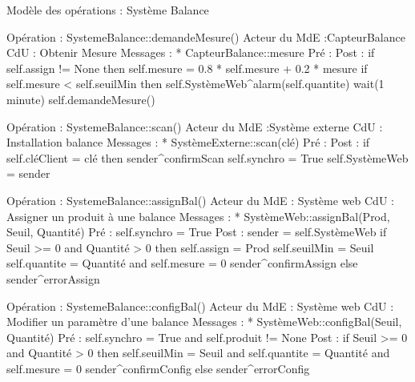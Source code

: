 ﻿Modèle des opérations : Système Balance


Opération : SystemeBalance::demandeMesure()
Acteur du MdE :CapteurBalance
CdU : Obtenir Mesure
Messages : 
* CapteurBalance::{mesure}
Pré : 
Post :
if self.assign != None then
self.mesure = 0.8 * self.mesure + 0.2 * mesure
if self.mesure < self.seuilMin then
        self.SystèmeWeb^alarm(self.quantite)
wait(1 minute)
self.demandeMesure()


Opération : SystemeBalance::scan()
Acteur du MdE :Système externe
CdU : Installation balance
Messages : 
* SystèmeExterne::{scan(clé)}
Pré :
Post :
if self.cléClient = clé then
sender^confirmScan
self.synchro = True
self.SystèmeWeb = sender


Opération : SystemeBalance::assignBal()
Acteur du MdE : Système web
CdU : Assigner un produit à une balance
Messages : 
* SystèmeWeb::{assignBal(Prod, Seuil, Quantité)}
Pré : self.synchro = True
Post : sender = self.SystèmeWeb
if Seuil >= 0 and Quantité > 0 then
self.assign = Prod
self.seuilMin = Seuil
self.quantite = Quantité and
self.mesure = 0
sender^confirmAssign
else
        sender^errorAssign


Opération : SystemeBalance::configBal()
Acteur du MdE : Système web
CdU : Modifier un paramètre d’une balance
Messages : 
* SystèmeWeb::{configBal(Seuil, Quantité)}
Pré : self.synchro = True and self.produit != None
Post : 
if Seuil >= 0 and Quantité > 0 then
self.seuilMin = Seuil
and self.quantite = Quantité and
self.mesure = 0
sender^confirmConfig
else
        sender^errorConfig